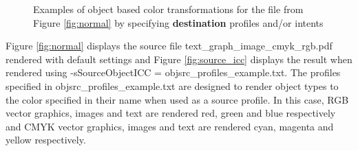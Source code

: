 \documentclass[12pt,notitlepage]{article}
\begin{document}
\begin{figure}
    \caption{Examples of object based color transformations for the file from Figure \ref{fig:normal} by specifying {\bf destination} profiles and/or intents}
  \label{fig:object_based_color}
\end{figure}

Figure \ref{fig:normal} displays the source file text\_graph\_image\_cmyk\_rgb.pdf rendered with default settings and Figure \ref{fig:source_icc} displays the result when rendered using  -sSourceObjectICC = objsrc\_profiles\_example.txt.   The profiles specified in objsrc\_profiles\_example.txt are designed to render object types to the color specified in their name when used as a source profile.  In this case, RGB vector graphics, images and text are rendered red, green and blue respectively and CMYK  vector graphics, images and text are rendered cyan, magenta and yellow respectively.\\
\end{document}
